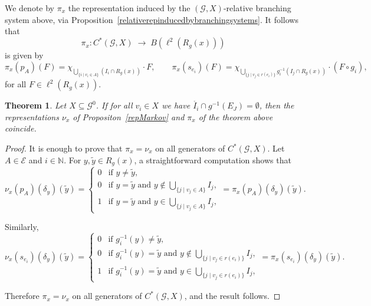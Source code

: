 \documentclass[12pt, reqno]{amsart}
\newtheorem{theorem}{Theorem}[section]
\theoremstyle{definition}
\theoremstyle{remark}
\numberwithin{equation}{section}
\begin{document}
We denote by $\pi_x$ the representation induced by the 
$(\mathcal{G},X)$-relative branching system above, via 
Proposition~\ref{relativerepinducedbybranchingsystems}. 
It follows that 
\[
\pi_x: C^*(\mathcal{G},X) \;\longrightarrow\; B(\ell^2(R_g(x)))
\]
is given by
\[
\pi_x(p_{A})(F) 
   = \chi_{\bigcup_{\{i \mid v_i \in A\}} (I_i \cap R_g(x))}\cdot F, 
   \qquad 
   \pi_x(s_{e_i})(F) 
   = \chi_{\bigcup_{\{j \mid v_j \in r(e_i)\}} g_i^{-1}(I_j \cap R_g(x))}\cdot (F \circ g_i),
\]
for all $F \in \ell^2(R_g(x))$.

\begin{theorem}\label{markovandbsareequal}
     Let $X \subseteq \mathcal{G}^0$. 
     If for all $v_i \in X$ we have $\mathring{I_i} \cap g^{-1}(E_J) = \emptyset$, 
     then the representations $\nu_x$ of Propositon~\ref{repMarkov} 
     and $\pi_x$ of the theorem above coincide.
\end{theorem}

\begin{proof}
It is enough to prove that $\pi_x = \nu_x$ on all generators of $C^*(\mathcal{G},X)$.  
Let $A \in \mathcal{E}$ and $i \in \mathbb{N}$. 
For $y,\tilde{y} \in R_g(x)$, a straightforward computation shows that
\[
\nu_x(p_A)(\delta_y)(\tilde{y}) =
\begin{cases}
    0 & \text{if } y \neq \tilde{y}, \\[4pt]
    0 & \text{if } y = \tilde{y} \text{ and } y \notin \bigcup_{\{j \mid v_j \in A\}} I_j, \\[4pt]
    1 & \text{if } y = \tilde{y} \text{ and } y \in \bigcup_{\{j \mid v_j \in A\}} I_j,
\end{cases}
= \pi_x(p_A)(\delta_y)(\tilde{y}).
\]

Similarly,
\[
\nu_x(s_{e_i})(\delta_y)(\tilde{y}) =
\begin{cases}
    0 & \text{if } g_i^{-1}(y) \neq \tilde{y}, \\[4pt]
    0 & \text{if } g_i^{-1}(y) = \tilde{y} 
         \text{ and } y \notin \bigcup_{\{j \mid v_j \in r(e_i)\}} I_j, \\[4pt]
    1 & \text{if } g_i^{-1}(y) = \tilde{y} 
         \text{ and } y \in \bigcup_{\{j \mid v_j \in r(e_i)\}} I_j,
\end{cases}
= \pi_x(s_{e_i})(\delta_y)(\tilde{y}).
\]

Therefore $\pi_x = \nu_x$ on all generators of $C^*(\mathcal{G},X)$, 
and the result follows.
\end{proof}

\end{document}
